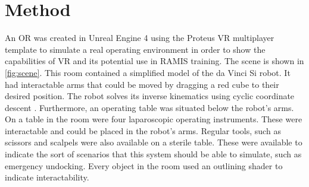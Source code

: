 \documentclass[conference]{IEEEtran}
\begin{document}
%

\section{Method}
An OR was created in Unreal Engine 4 using the Proteus VR multiplayer template to simulate a real operating environment in order to show the capabilities of VR and its potential use in RAMIS training. The scene is shown in \autoref{fig:scene}. This room contained a simplified model of the da Vinci Si robot. It had interactable arms that could be moved by dragging a red cube to their desired position. The robot solves its inverse kinematics using cyclic coordinate descent \citep{wang_combined_1991}. Furthermore, an operating table was situated below the robot's arms. On a table in the room were four laparoscopic operating instruments. These were interactable and could be placed in the robot's arms. Regular tools, such as scissors and scalpels were also available on a sterile table. These were available to indicate the sort of scenarios that this system should be able to simulate, such as emergency undocking. Every object in the room used an outlining shader to indicate interactability. 
\end{document}
